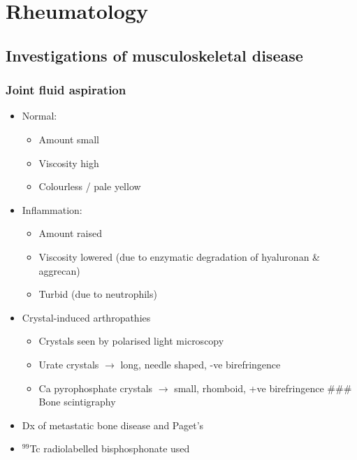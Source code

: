 \documentclass[
  12pt,
]{memoir}
\providecommand{\tightlist}{%
  \setlength{\itemsep}{0pt}\setlength{\parskip}{0pt}}
\begin{document}
\pagebreak

\hypertarget{rheumatology}{%
\chapter{Rheumatology}\label{rheumatology}}

\hypertarget{investigations-of-musculoskeletal-disease}{%
\section{Investigations of musculoskeletal
disease}\label{investigations-of-musculoskeletal-disease}}

\hypertarget{joint-fluid-aspiration}{%
\subsection{Joint fluid aspiration}\label{joint-fluid-aspiration}}

\begin{itemize}
\tightlist
\item
  Normal:

  \begin{itemize}
  \tightlist
  \item
    Amount small
  \item
    Viscosity high
  \item
    Colourless / pale yellow
  \end{itemize}
\item
  Inflammation:

  \begin{itemize}
  \tightlist
  \item
    Amount raised
  \item
    Viscosity lowered (due to enzymatic degradation of hyaluronan \&
    aggrecan)
  \item
    Turbid (due to neutrophils)
  \end{itemize}
\item
  Crystal-induced arthropathies

  \begin{itemize}
  \tightlist
  \item
    Crystals seen by polarised light microscopy
  \item
    Urate crystals \(\rightarrow\) long, needle shaped, -ve
    birefringence
  \item
    Ca pyrophosphate crystals \(\rightarrow\) small, rhomboid, +ve
    birefringence \#\#\# Bone scintigraphy
  \end{itemize}
\item
  Dx of metastatic bone disease and Paget's
\item
  \(^99\)Tc radiolabelled bisphosphonate used
\end{itemize}
\end{document}

